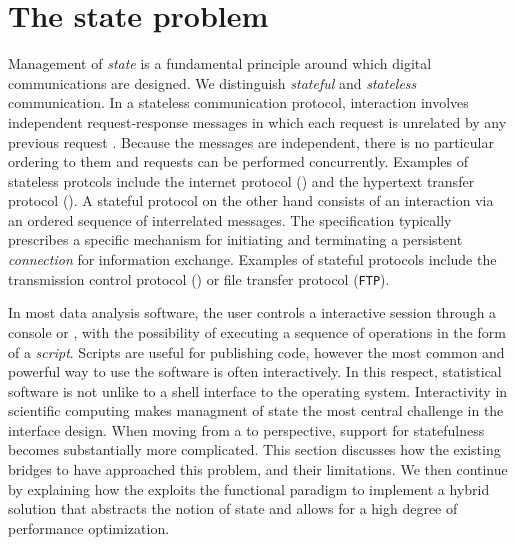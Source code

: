 \section{The state problem}

Management of \emph{state} is a fundamental principle around which digital communications are designed. We distinguish \emph{stateful} and \emph{stateless} communication. In a stateless communication protocol, interaction involves independent request-response messages in which each request is unrelated by any previous request \citep{hennessy2012computer}. Because the messages are independent, there is no particular ordering to them and requests can be performed concurrently. Examples of stateless protcols include the internet protocol (\IP) and the hypertext transfer protocol (\HTTP). A stateful protocol on the other hand consists of an interaction via an ordered sequence of interrelated messages. The specification typically prescribes a specific mechanism for initiating and terminating a persistent \emph{connection} for information exchange. Examples of stateful protocols include the transmission control protocol (\TCP) or file transfer protocol (\texttt{FTP}).


In most data analysis software, the user controls a interactive session through a console or \GUI, with the possibility of executing a sequence of operations in the form of a \emph{script}. Scripts are useful for publishing code, however the most common and powerful way to use the software is often interactively. In this respect, statistical software is not unlike to a shell interface to the operating system. Interactivity in scientific computing makes managment of state the most central challenge in the interface design. When moving from a \UI to \API perspective, support for statefulness becomes substantially more complicated. This section discusses how the existing bridges to \R have approached this problem, and their limitations. We then continue by explaining how the \OpenCPU \API exploits the functional paradigm to implement a hybrid solution that abstracts the notion of state and allows for a high degree of performance optimization.

